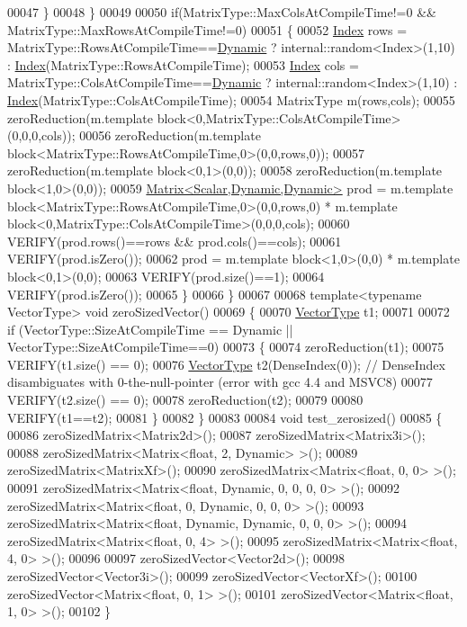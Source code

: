 \begin{DoxyCode}
00047     \}
00048   \}
00049 
00050   \textcolor{keywordflow}{if}(MatrixType::MaxColsAtCompileTime!=0 && MatrixType::MaxRowsAtCompileTime!=0)
00051   \{
00052     \hyperlink{namespace_eigen_a62e77e0933482dafde8fe197d9a2cfde}{Index} rows = MatrixType::RowsAtCompileTime==\hyperlink{namespace_eigen_ad81fa7195215a0ce30017dfac309f0b2}{Dynamic} ? internal::random<Index>(1,10) : 
      \hyperlink{namespace_eigen_a62e77e0933482dafde8fe197d9a2cfde}{Index}(MatrixType::RowsAtCompileTime);
00053     \hyperlink{namespace_eigen_a62e77e0933482dafde8fe197d9a2cfde}{Index} cols = MatrixType::ColsAtCompileTime==\hyperlink{namespace_eigen_ad81fa7195215a0ce30017dfac309f0b2}{Dynamic} ? internal::random<Index>(1,10) : 
      \hyperlink{namespace_eigen_a62e77e0933482dafde8fe197d9a2cfde}{Index}(MatrixType::ColsAtCompileTime);
00054     MatrixType m(rows,cols);
00055     zeroReduction(m.template block<0,MatrixType::ColsAtCompileTime>(0,0,0,cols));
00056     zeroReduction(m.template block<MatrixType::RowsAtCompileTime,0>(0,0,rows,0));
00057     zeroReduction(m.template block<0,1>(0,0));
00058     zeroReduction(m.template block<1,0>(0,0));
00059     \hyperlink{group___core___module}{Matrix<Scalar,Dynamic,Dynamic>} prod = m.template 
      block<MatrixType::RowsAtCompileTime,0>(0,0,rows,0) * m.template block<0,MatrixType::ColsAtCompileTime>(0,0,0,cols);
00060     VERIFY(prod.rows()==rows && prod.cols()==cols);
00061     VERIFY(prod.isZero());
00062     prod = m.template block<1,0>(0,0) * m.template block<0,1>(0,0);
00063     VERIFY(prod.size()==1);
00064     VERIFY(prod.isZero());
00065   \}
00066 \}
00067 
00068 \textcolor{keyword}{template}<\textcolor{keyword}{typename} VectorType> \textcolor{keywordtype}{void} zeroSizedVector()
00069 \{
00070   \hyperlink{struct_vector_type}{VectorType} t1;
00071 
00072   \textcolor{keywordflow}{if} (VectorType::SizeAtCompileTime == Dynamic || VectorType::SizeAtCompileTime==0)
00073   \{
00074     zeroReduction(t1);
00075     VERIFY(t1.size() == 0);
00076     \hyperlink{struct_vector_type}{VectorType} t2(DenseIndex(0)); \textcolor{comment}{// DenseIndex disambiguates with 0-the-null-pointer (error with
       gcc 4.4 and MSVC8)}
00077     VERIFY(t2.size() == 0);
00078     zeroReduction(t2);
00079 
00080     VERIFY(t1==t2);
00081   \}
00082 \}
00083 
00084 \textcolor{keywordtype}{void} test\_zerosized()
00085 \{
00086   zeroSizedMatrix<Matrix2d>();
00087   zeroSizedMatrix<Matrix3i>();
00088   zeroSizedMatrix<Matrix<float, 2, Dynamic> >();
00089   zeroSizedMatrix<MatrixXf>();
00090   zeroSizedMatrix<Matrix<float, 0, 0> >();
00091   zeroSizedMatrix<Matrix<float, Dynamic, 0, 0, 0, 0> >();
00092   zeroSizedMatrix<Matrix<float, 0, Dynamic, 0, 0, 0> >();
00093   zeroSizedMatrix<Matrix<float, Dynamic, Dynamic, 0, 0, 0> >();
00094   zeroSizedMatrix<Matrix<float, 0, 4> >();
00095   zeroSizedMatrix<Matrix<float, 4, 0> >();
00096 
00097   zeroSizedVector<Vector2d>();
00098   zeroSizedVector<Vector3i>();
00099   zeroSizedVector<VectorXf>();
00100   zeroSizedVector<Matrix<float, 0, 1> >();
00101   zeroSizedVector<Matrix<float, 1, 0> >();
00102 \}
\end{DoxyCode}
